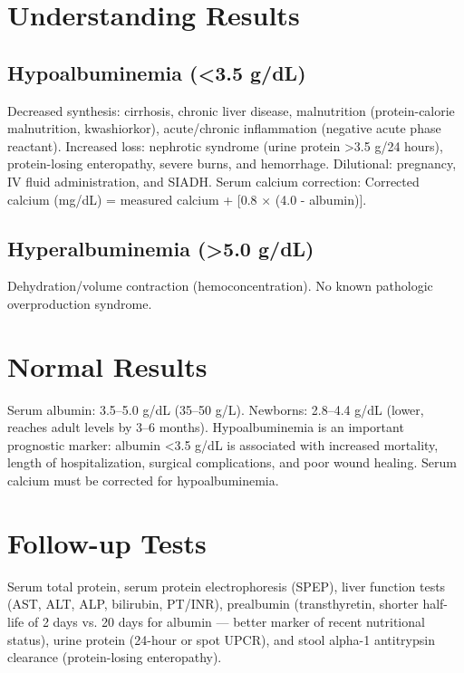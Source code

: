 \section*{Understanding Results}
\subsection*{Hypoalbuminemia (<3.5 g/dL)}
Decreased synthesis: cirrhosis, chronic liver disease, malnutrition (protein-calorie malnutrition, kwashiorkor), acute/chronic inflammation (negative acute phase reactant). Increased loss: nephrotic syndrome (urine protein >3.5 g/24 hours), protein-losing enteropathy, severe burns, and hemorrhage. Dilutional: pregnancy, IV fluid administration, and SIADH. Serum calcium correction: Corrected calcium (mg/dL) = measured calcium + [0.8 $\times$ (4.0 - albumin)].
\subsection*{Hyperalbuminemia (>5.0 g/dL)}
Dehydration/volume contraction (hemoconcentration). No known pathologic overproduction syndrome.
\section*{Normal Results}
Serum albumin: 3.5--5.0 g/dL (35--50 g/L). Newborns: 2.8--4.4 g/dL (lower, reaches adult levels by 3--6 months). Hypoalbuminemia is an important prognostic marker: albumin <3.5 g/dL is associated with increased mortality, length of hospitalization, surgical complications, and poor wound healing. Serum calcium must be corrected for hypoalbuminemia.
\section*{Follow-up Tests}
Serum total protein, serum protein electrophoresis (SPEP), liver function tests (AST, ALT, ALP, bilirubin, PT/INR), prealbumin (transthyretin, shorter half-life of 2 days vs. 20 days for albumin --- better marker of recent nutritional status), urine protein (24-hour or spot UPCR), and stool alpha-1 antitrypsin clearance (protein-losing enteropathy).
